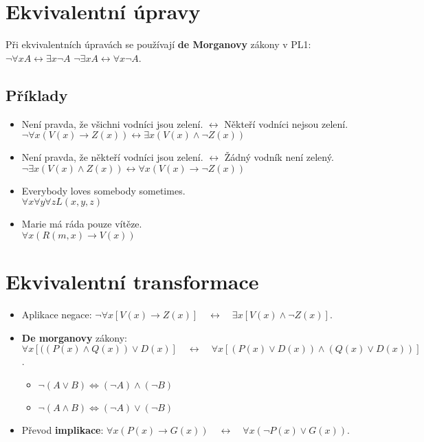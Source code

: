 \section{Ekvivalentní úpravy}
Při ekvivalentních úpravách se používají \textbf{de Morganovy} zákony v PL1: $\neg \forall xA \leftrightarrow \exists x\neg A$ \qquad $\neg \exists xA \leftrightarrow \forall x\neg A$.

\subsection*{Příklady}
\begin{itemize}
    \item Není pravda, že všichni vodníci jsou zelení. $ \leftrightarrow $ Někteří vodníci nejsou zelení.\\$\neg{}\forall{}x (V(x) \rightarrow Z(x)) \leftrightarrow \exists{}x (V(x) \land \neg{}Z(x))$
    \item Není pravda, že někteří vodníci jsou zelení. $ \leftrightarrow $ Žádný vodník není zelený.\\
          $\neg{}\exists{}x (V(x) \land Z(x)) \leftrightarrow \forall{}x (V(x) \rightarrow \neg{}Z(x))$
    \item Everybody loves somebody sometimes.\\
          $\forall{}x \forall{}y \forall{}z L(x,y,z)$
    \item Marie má ráda pouze vítěze.\\
          $\forall{}x (R(m,x) \rightarrow V(x))$
\end{itemize}

\section{Ekvivalentní transformace}
\begin{itemize}
    \item Aplikace negace: $\neg{}\forall{}x [V(x) \rightarrow{} Z(x)] \quad \leftrightarrow \quad \exists{}x [V(x) \land{} \neg{}Z(x)]$.
    \item \textbf{De morganovy} zákony: $\forall{}x [((P(x) \land{}Q(x)) \lor{}D(x)] \quad \leftrightarrow \quad \forall{}x [(P(x) \lor{}D(x)) \land{}(Q(x) \lor{}D(x))]$.
          \begin{itemize}
              \item[] $\neg (A\vee B)\iff (\neg A)\wedge (\neg B)$
              \item[] $\neg (A\wedge B)\iff (\neg A)\vee (\neg B)$
          \end{itemize}
    \item Převod \textbf{implikace}: $\forall{}x (P(x) \rightarrow{}G(x)) \quad \leftrightarrow \quad \forall{}x (\neg{}P(x)\lor{}G(x))$.
\end{itemize}

